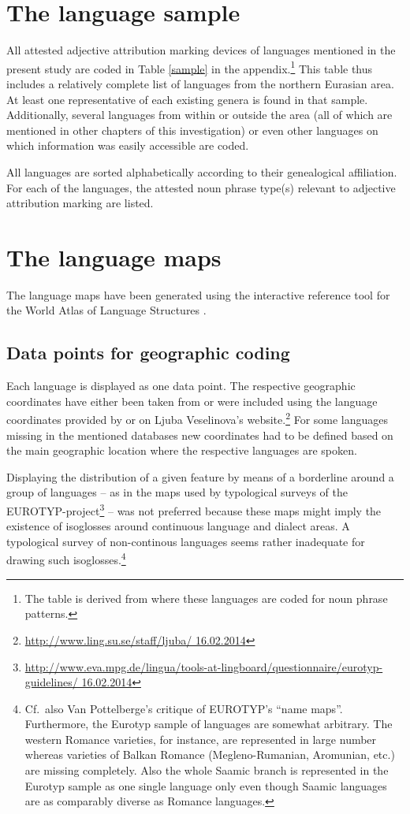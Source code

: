 \section{The language sample}
All attested adjective attribution marking devices of languages mentioned in the present study are coded in Table \ref{sample} in the appendix.\footnote{The table is derived from \citet{AUTOTYP-NP} where these languages are coded for noun phrase patterns.} This table thus includes a relatively complete list of languages from the northern Eurasian area. At least one representative of each existing genera is found in that sample. Additionally, several languages from within or outside the area (all of which are mentioned in other chapters of this investigation) or even other languages on which information was easily accessible are coded.

All languages are sorted alphabetically according to their genealogical affiliation. For each of the languages, the attested noun phrase type(s) relevant to adjective attribution marking are listed.

\section{The language maps}
The language maps have been generated using the interactive reference tool 
for the World Atlas of Language Structures \citep{bibiko2005}. 

\subsection[Geographic coding]{Data points for geographic coding}
Each language is displayed as one data point. The respective geographic coordinates have either been taken from \cite{WALS} or were included using the language coordinates provided by \cite{AUTOTYP} or on Ljuba Veselinova's website.\footnote{\url{http://www.ling.su.se/staff/ljuba/ 16.02.2014}} For some languages missing in the mentioned databases new coordinates had to be defined based on the main geographic location where the respective languages are spoken.

Displaying the distribution of a given feature by means of a borderline around a group of languages – as in the maps used by typological surveys of the EUROTYP-project\footnote{\url{http://www.eva.mpg.de/lingua/tools-at-lingboard/questionnaire/eurotyp-guidelines/ 16.02.2014}} – was not preferred because these maps might imply the existence of isoglosses around continuous language and dialect areas. A typological survey of non-continous languages seems rather inadequate for drawing such isoglosses.\footnote{Cf.~also Van Pottelberge's \citeyear{van-pottelberge2001} critique of EUROTYP's “name maps”. Furthermore, the Eurotyp sample of languages are somewhat arbitrary. The western Romance varieties, for instance, are represented in large number whereas varieties of Balkan Romance (Megleno-Rumanian, Aromunian, etc.) are missing completely. Also the whole Saamic branch is represented in the Eurotyp sample as one single language only even though Saamic languages are as comparably diverse as Romance languages.}

